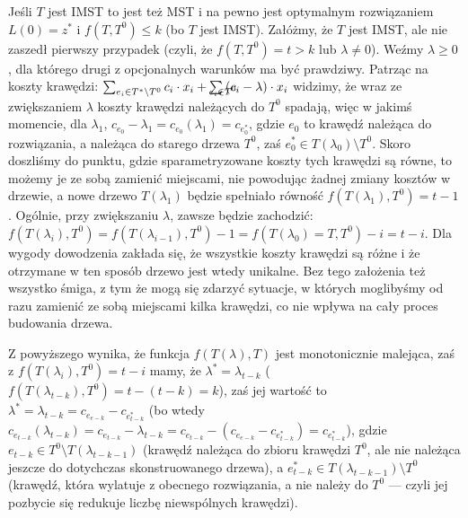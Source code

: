 \begin{itemize}
	Jeśli $T$ jest IMST to jest też MST i na pewno jest optymalnym rozwiązaniem $L \left( 0 \right) = z^{\ast}$ i $f \left( T, T^{0} \right) \leqslant k$ (bo $T$ jest IMST). Załóżmy, że $T$ jest IMST, ale nie zaszedł pierwszy przypadek (czyli, że $f \left( T, T^{0} \right) = t > k$ lub $\lambda \neq 0$). Weźmy $\lambda \geqslant 0$, dla którego drugi z opcjonalnych warunków ma być prawdziwy. Patrząc na koszty krawędzi: $\sum_{e_{i} \in T^{\ast} \setminus T^{0}} c_{i} \cdot x_{i} + \sum_{\mathclap{e_{i} \in T^{0}}} \left( c_{i} - \lambda \right) \cdot x_{i}$ widzimy, że wraz ze zwiększaniem $\lambda$ koszty krawędzi należących do $T^{0}$ spadają, więc w jakimś momencie, dla $\lambda_{1}$, $c_{e_{0}} - \lambda_{1} = c_{e_{0}} \left( \lambda_{1} \right) = c_{e^{\ast}_{0}}$, gdzie $e_{0}$ to krawędź należąca do rozwiązania, a należąca do starego drzewa $T^{0}$, zaś $e^{\ast}_{0} \in T \left( \lambda_{0} \right) \setminus T^{0}$. Skoro doszliśmy do punktu, gdzie sparametryzowane koszty tych krawędzi są równe, to możemy je ze sobą zamienić miejscami, nie powodując żadnej zmiany kosztów w drzewie, a nowe drzewo $T \left( \lambda_{1} \right)$ będzie spełniało równość $f \left( T \left( \lambda_{1} \right), T^{0} \right) = t - 1$. Ogólnie, przy zwiększaniu $\lambda$, zawsze będzie zachodzić: $f \left( T \left( \lambda_{i} \right), T^{0} \right) = f \left( T \left( \lambda_{i-1} \right), T^{0} \right) - 1 = f \left( T \left( \lambda_{0} \right) = T, T^{0} \right) - i = t - i$. Dla wygody dowodzenia zakłada się, że wszystkie koszty krawędzi są różne i że otrzymane w ten sposób drzewo jest wtedy unikalne. Bez tego założenia też wszystko śmiga, z tym że mogą się zdarzyć sytuacje, w których moglibyśmy od razu zamienić ze sobą miejscami kilka krawędzi, co nie wpływa na cały proces budowania drzewa.
	
	Z powyższego wynika, że funkcja $f \left( T \left( \lambda \right), T \right)$ jest monotonicznie malejąca, zaś z $f \left( T \left( \lambda_{i} \right), T^{0} \right) = t - i$ mamy, że $\lambda^{\ast} = \lambda_{t-k}$ ($f \left( T \left( \lambda_{t-k} \right), T^{0} \right) = t - \left( t - k \right) = k$), zaś jej wartość to $\lambda^{\ast} = \lambda_{t-k} = c_{e_{e-k}} - c_{e^{\ast}_{t-k}}$ (bo wtedy $c_{e_{t-k}} \left( \lambda_{t-k} \right) = c_{e_{t-k}} - \lambda_{t-k} = c_{e_{t-k}} - \left( c_{e_{e-k}} - c_{e^{\ast}_{t-k}} \right) = c_{e^{\ast}_{t-k}}$), gdzie $e_{t-k} \in T^{0} \setminus T \left( \lambda_{t-k-1} \right)$ (krawędź należąca do zbioru krawędzi $T^{0}$, ale nie należąca jeszcze do dotychczas skonstruowanego drzewa), a $e^{\ast}_{t-k} \in T \left( \lambda_{t-k-1} \right) \setminus  T^{0}$ (krawędź, która wylatuje z obecnego rozwiązania, a nie należy do $T^{0}$ --- czyli jej pozbycie się redukuje liczbę niewspólnych krawędzi).


\end{itemize}
